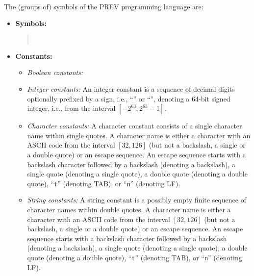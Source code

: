 \documentclass[10pt]{article}
\begin{document}
The (groups of) symbols of the PREV programming language are:
\begin{itemize}
\item \textbf{Symbols:}
\begin{quote}
\ \ \ \ \ \ \ \ \ \ \ \ \ \ \ \ \ \ \ \ \ \ \ \ \ \ \ \ \ \ \ \ \ \ \ \ \ \ \ \ \ \ \ \ \ \ \ \ \ \ 
\end{quote}
\item \textbf{Constants:}
\begin{itemize}
\item \textit{Boolean constants:} \ \ 
\item \textit{Integer constants:} An integer constant is a sequence of decimal digits optionally prefixed by a sign, i.e., ``\texttt{}'' or ``\texttt{}'', denoting a 64-bit signed integer, i.e., from the interval $ [-2^{63},2^{63}-1] $.
\item \textit{Character constants:} A character constant consists of a single character name within single quotes.  A character name is either a character with an ASCII code from the interval $[32,126]$ (but not a backslash, a single or a double quote) or an escape sequence.  An escape sequence starts with a backslash character followed by a backslash (denoting a backslash), a single quote (denoting a single quote), a double quote (denoting a double quote), ``\texttt{t}'' (denoting TAB), or ``\texttt{n}'' (denoting LF).
\item \textit{String constants:} A string constant is a possibly empty finite sequence of character names within double quotes.  A character name is either a character with an ASCII code from the interval $[32,126]$ (but not a backslash, a single or a double quote) or an escape sequence.  An escape sequence starts with a backslash character followed by a backslash (denoting a backslash), a single quote (denoting a single quote), a double quote (denoting a double quote), ``\texttt{t}'' (denoting TAB), or ``\texttt{n}'' (denoting LF).

\end{itemize}
\end{itemize}
\end{document}
